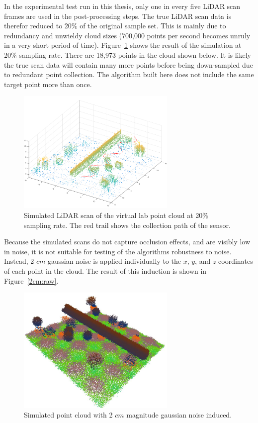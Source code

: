 \documentclass[12pt]{drexelthesis}
\begin{document}
In the experimental test run in this thesis, only one in every five LiDAR scan frames are used in the post-processing steps. The true LiDAR scan data is therefor reduced to 20\% of the original sample set. This is mainly due to redundancy and unwieldy cloud sizes (700,000 points per second becomes unruly in a very short period of time). Figure~\ref{lidarsim:20psample} shows the result of the simulation at 20\% sampling rate. There are 18,973 points in the cloud shown below. It is likely the true scan data will contain many more points before being down-sampled due to redundant point collection. The algorithm built here does not include the same target point more than once.

\begin{figure}[!ht]
	\centering
	\includegraphics[width=3in]{simulated-lab-scan/lidarSim/20psample.png}
	\caption[Simulated LiDAR scan at 20\% sampling rate]{\centering Simulated LiDAR scan of the virtual lab point cloud at 20\% sampling rate. The red trail shows the collection path of the sensor.}
	\label{lidarsim:20psample}
\end{figure}

Because the simulated scans do not capture occlusion effects, and are visibly low in noise, it is not suitable for testing of the algorithms robustness to noise. Instead, 2 $cm$ gaussian noise is applied individually to the $x$, $y$, and $z$ coordinates of each point in the cloud. The result of this induction is shown in Figure~\ref{2cm:raw}.

\begin{figure}[!ht] 
	\centering
		\includegraphics[width=3in]{simulated-lab-scan/2cmnoise/rawcloud.jpg}
		\caption[Simulated point cloud with 2cm magnitude gaussian noise induced]{\centering  Simulated point cloud with 2 $cm$ magnitude gaussian noise induced.}
\label{2cmnoise:raw}
\end{figure}
\end{document}
